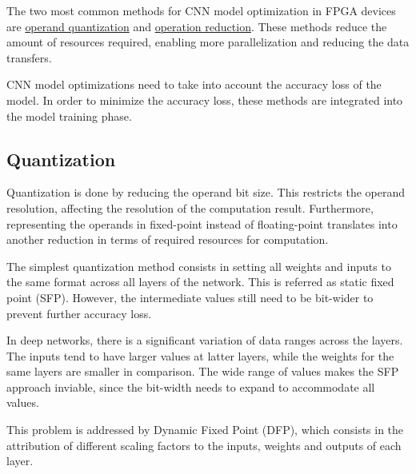 The two most common methods for CNN model optimization in FPGA
devices are \underline{operand quantization}  and \underline{operation reduction}.
These methods reduce the amount of resources required, enabling more
parallelization and reducing the data transfers.

CNN model optimizations need to take into account the accuracy loss of the
model. In order to minimize the accuracy loss, these methods are integrated into
the model training phase.

%

\subsection{Quantization}
\label{sec:quantization}
Quantization is done by reducing the operand bit size. This restricts the
operand resolution, affecting the resolution of the computation
result. Furthermore, representing the operands in fixed-point instead of
floating-point translates into another reduction in terms of required resources
for computation.

The simplest quantization method consists in setting all weights and inputs to
the same format across all layers of the network. This is referred as static
fixed point (SFP). However, the intermediate values still need to be bit-wider
to prevent further accuracy loss.

In deep networks, there is a significant variation of data ranges across the
layers. The inputs tend to have larger values at latter layers, while the
weights for the same layers are smaller in comparison. The wide range of values
makes the SFP approach inviable, since the bit-width needs to expand to
accommodate all values.

This problem is addressed by Dynamic Fixed Point (DFP), which consists in the
attribution of different scaling factors to the inputs, weights and outputs of
each layer.

